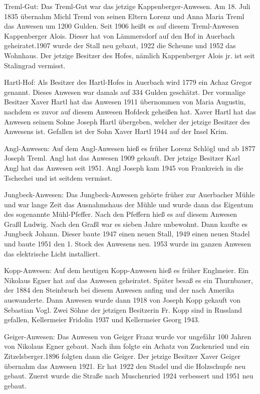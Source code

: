 \documentclass[12pt,a4pager]{book}
\begin{document}
Treml-Gut: Das Treml-Gut war das jetzige Kappenberger-Anwesen. Am 18. Juli 1835
übernahm Michl Treml von seinen Eltern Lorenz und Anna Maria Treml das Anwesen
um 1200 Gulden. Seit 1906 heißt es auf diesem Treml-Anwesen Kappenberger Alois.
Dieser hat von Lämmersdorf auf den Hof in Auerbach geheiratet.1907 wurde der
Stall neu gebaut, 1922 die Scheune und 1952 das Wohnhaus. Der jetzige Besitzer
des Hofes, nämlich Kappenberger Alois jr. ist seit Stalingrad vermisst.

Hartl-Hof: Als Besitzer des Hartl-Hofes in Auerbach wird 1779 ein Achaz Gregor
genannt. Dieses Anwesen war damals auf 334 Gulden geschätzt. Der vormalige
Besitzer Xaver Hartl hat das Anwesen 1911 übernommen von Maria Augustin, nachdem
es zuvor auf diesem Anwesen Hofdeck geheißen hat. Xaver Hartl hat das Anwesen
seinem Sohne Joseph Hartl übergeben, welcher der jetzige Besitzer des Anwesens
ist. Gefallen ist der Sohn Xaver Hartl 1944 auf der Insel Krim.

Angl-Anwesen: Auf dem Angl-Anwesen hieß es früher Lorenz Schlögl und ab 1877
Joseph Treml. Angl hat das Anwesen 1909 gekauft. Der jetzige Besitzer Karl Angl
hat das Anwesen seit 1951. Angl Joseph kam 1945 von Frankreich in die Tschechei
und ist seitdem vermisst.

Jungbeck-Anwesen: Das Jungbeck-Anwesen gehörte früher zur Auerbacher Mühle und
war lange Zeit das Ausnahmshaus der Mühle und wurde dann das Eigentum des
sogenannte Mühl-Pfeffer. Nach den Pfeffern hieß es auf diesem Anwesen Graßl
Ludwig. Nach den Graßl war es sieben Jahre unbewohnt. Dann kaufte es Jungbeck
Johann. Dieser baute 1947 einen neuen Stall, 1949 einen neuen Stadel und baute
1951 den 1. Stock des Anwesens neu. 1953 wurde im ganzen Anwesen das elektrische
Licht installiert.

Kopp-Anwesen: Auf dem heutigen Kopp-Anwesen hieß es früher Englmeier. Ein
Nikolaus Egner hat auf das Anwesen geheiratet. Später besaß es ein Thurnbauer,
der 1884 den Steinbruch bei diesem Anwesen anfing und der nach Amerika
auswanderte. Dann Anwesen wurde dann 1918 von Joseph Kopp gekauft von Sebastian
Vogl. Zwei Söhne der jetzigen Besitzerin Fr. Kopp sind in Russland gefallen,
Kellermeier Fridolin 1937 und Kellermeier Georg 1943.

Geiger-Anwesen: Das Anwesen von Geiger Franz wurde vor ungefähr 100 Jahren von
Nikolaus Egner gebaut. Nach ihm folgte ein Achatz von Zuckenried und ein
Zitzelsberger.1896 folgten dann die Geiger. Der jetzige Besitzer Xaver Geiger
übernahm das Anwesen 1921. Er hat 1922 den Stadel und die Holzschupfe neu
gebaut. Zuerst wurde die Straße nach Muschenried 1924 verbessert und 1951 neu
gebaut.
\end{document}
